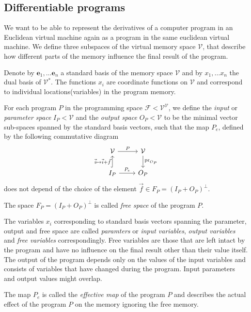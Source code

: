\documentclass[smallcondensed]{svjour3}
\newcommand{\VV}{\mathcal{V}}
\newcommand{\e}{\mathbf{e}}
\newcommand{\F}{\mathcal{F}}
\begin{document}
\subsection{Differentiable programs}
We want to be able to represent the derivatives of a computer program in an
Euclidean virtual machine again as a program in the same euclidean virtual
machine. We define three subspaces of the virtual memory space $\VV$, that
describe how different parts of the memory influence the final result of the
program.   

Denote by $\e_1,\ldots \e_n$ a standard basis of the memory space $\VV$ and by
$x_1,\ldots x_n$ the dual basis of $\VV^*$. The functions $x_i$ are coordinate
functions on $\VV$ and correspond to individual locations(variables) in the
program memory.

\begin{definition}
  For each program $P$ in the programming space $\F<\VV^\VV$,
  we define the \emph{input} or \emph{parameter space} $I_P<\VV$ and the
  \emph{output space} $O_P<\VV$ to be the minimal vector sub-spaces spanned by
  the standard basis vectors, such that the map $P_e$, defined by the following
  commutative diagram 
\begin{equation} 
    \label{eq:induced_map}
\begin{tikzcd}
  \VV \arrow{r}{P} & 
  \VV \arrow{d}{\mathrm{pr}_{O_P}}\\
  I_P \arrow[hook]{u}{\vec{i}\mapsto \vec{i}+\vec{f}} 
  \arrow{r}{P_e}& O_P
\end{tikzcd}
  \end{equation}
does not depend of the choice of the element 
$\vec{f}\in F_P=(I_P+O_P)^\perp$.

The space $F_P=(I_P+O_P)^\perp$ is called \emph{free space} of the program $P$.
\end{definition}

The variables $x_i$ corresponding to standard
basis vectors spanning the parameter, output and free space are called
\emph{paramters} or \emph{input variables}, \emph{output variables} and
\emph{free variables} correspondingly. Free variables are those that are
left intact by the program and have no influence on the final result other than
their value itself. The output of the program depends only on the values
of the input variables and consists of variables that have changed during
the program. Input parameters and output values might overlap. 

The map $P_e$ is called the \emph{effective map} of the program $P$ and
describes the actual effect of the program $P$ on the memory
ignoring the free memory. 
\end{document}

